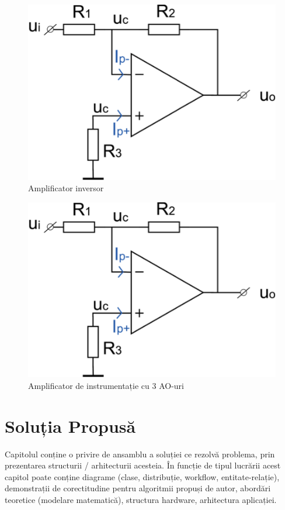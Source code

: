\documentclass[12pt,a4paper]{report}
\begin{document}
\begin{figure}[th]
	\centering
	\includegraphics{pics/Pic1.png}
	\caption{Amplificator inversor}
	\label{fig:pic1}
\end{figure}

\newpage

\begin{figure}[th]
	\centering
	\includegraphics{pics/Pic1.png}
	\caption[Amplificator de instrumentație cu 3 AO-uri]{Amplificator de instrumentație cu 3 AO-uri\protect\footnotemark}
	\label{fig:pic2}
\end{figure}

\chapter{Soluția Propusă}
Capitolul conține o privire de ansamblu a soluției ce rezolvă problema, prin prezentarea structurii / arhitecturii acesteia. În funcție de tipul lucrării acest capitol poate conține diagrame (clase, distribuție, workflow, entitate-relație), demonstrații de corectitudine pentru algoritmii propuși de autor, abordări teoretice (modelare matematică), structura hardware, arhitectura aplicației.
\end{document}
